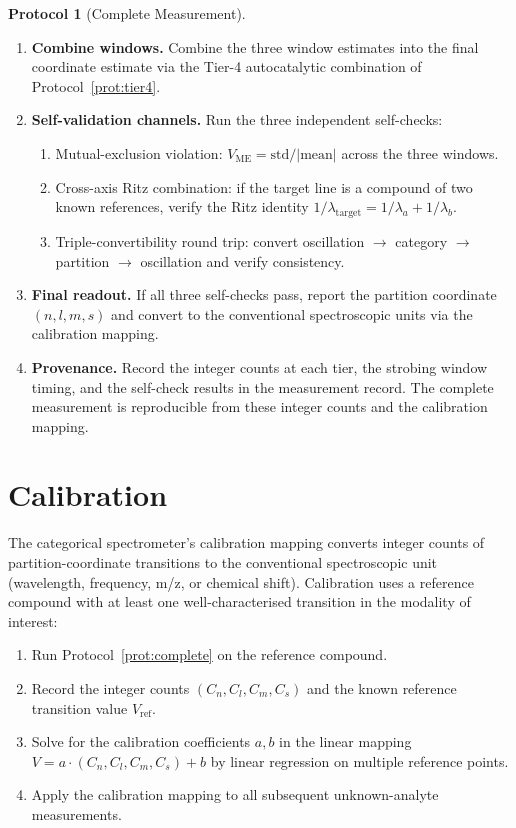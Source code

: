 \documentclass[11pt,a4paper]{article}
\theoremstyle{thmstyle}
\theoremstyle{axiomstyle}
\theoremstyle{definition}
\newtheorem{protocol}[theorem]{Protocol}
\theoremstyle{remark}
\newcommand{\Vme}{V_{\mathrm{ME}}}
\begin{document}
\begin{protocol}[Complete Measurement]
\begin{enumerate}[label=\textbf{Step \arabic*:},leftmargin=*]
\item \textbf{Combine windows.} Combine the three window estimates into the final coordinate estimate via the Tier-4 autocatalytic combination of Protocol~\ref{prot:tier4}.

\item \textbf{Self-validation channels.} Run the three independent self-checks:
  \begin{enumerate}[label=(\alph*),nosep]
  \item Mutual-exclusion violation: $\Vme=\mathrm{std}/|\mathrm{mean}|$ across the three windows.
  \item Cross-axis Ritz combination: if the target line is a compound of two known references, verify the Ritz identity $1/\lambda_{\mathrm{target}}=1/\lambda_{a}+1/\lambda_{b}$.
  \item Triple-convertibility round trip: convert oscillation $\to$ category $\to$ partition $\to$ oscillation and verify consistency.
  \end{enumerate}

\item \textbf{Final readout.} If all three self-checks pass, report the partition coordinate $(n,l,m,s)$ and convert to the conventional spectroscopic units via the calibration mapping.

\item \textbf{Provenance.} Record the integer counts at each tier, the strobing window timing, and the self-check results in the measurement record. The complete measurement is reproducible from these integer counts and the calibration mapping.
\end{enumerate}
\end{protocol}

\section{Calibration}
\label{sec:methods_calibration}

The categorical spectrometer's calibration mapping converts integer counts of partition-coordinate transitions to the conventional spectroscopic unit (wavelength, frequency, m/z, or chemical shift). Calibration uses a reference compound with at least one well-characterised transition in the modality of interest:

\begin{enumerate}[nosep]
\item Run Protocol~\ref{prot:complete} on the reference compound.
\item Record the integer counts $(C_{n},C_{l},C_{m},C_{s})$ and the known reference transition value $V_{\mathrm{ref}}$.
\item Solve for the calibration coefficients $a, b$ in the linear mapping $V=a\cdot(C_{n},C_{l},C_{m},C_{s})+b$ by linear regression on multiple reference points.
\item Apply the calibration mapping to all subsequent unknown-analyte measurements.
\end{enumerate}
\end{document}
